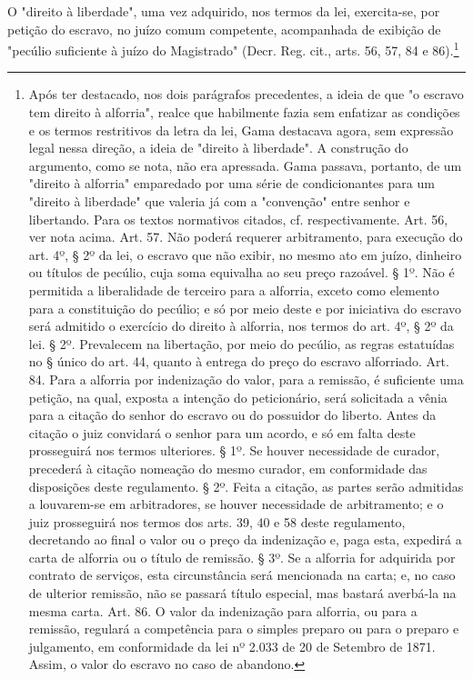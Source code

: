 O "direito à liberdade", uma vez adquirido, nos termos da lei,
exercita-se, por petição do escravo, no juízo comum competente,
acompanhada de exibição de "pecúlio suficiente à juízo do Magistrado"
(Decr. Reg. cit., arts. 56, 57, 84 e 86).\footnote{Após ter destacado,
  nos dois parágrafos precedentes, a ideia de que "o escravo tem direito
  à alforria", realce que habilmente fazia sem enfatizar as condições e
  os termos restritivos da letra da lei, Gama destacava agora, sem
  expressão legal nessa direção, a ideia de "direito à liberdade". A
  construção do argumento, como se nota, não era apressada. Gama
  passava, portanto, de um "direito à alforria" emparedado por uma série
  de condicionantes para um "direito à liberdade" que valeria já com a
  "convenção" entre senhor e libertando. Para os textos normativos
  citados, cf. respectivamente. Art. 56, ver nota acima. Art. 57. Não
  poderá requerer arbitramento, para execução do art. 4º, § 2º da lei, o
  escravo que não exibir, no mesmo ato em juízo, dinheiro ou títulos de
  pecúlio, cuja soma equivalha ao seu preço razoável. § 1º. Não é
  permitida a liberalidade de terceiro para a alforria, exceto como
  elemento para a constituição do pecúlio; e só por meio deste e por
  iniciativa do escravo será admitido o exercício do direito à alforria,
  nos termos do art. 4º, § 2º da lei. § 2º. Prevalecem na libertação,
  por meio do pecúlio, as regras estatuídas no § único do art. 44,
  quanto à entrega do preço do escravo alforriado. Art. 84. Para a
  alforria por indenização do valor, para a remissão, é suficiente uma
  petição, na qual, exposta a intenção do peticionário, será solicitada
  a vênia para a citação do senhor do escravo ou do possuidor do
  liberto. Antes da citação o juiz convidará o senhor para um acordo, e
  só em falta deste prosseguirá nos termos ulteriores. § 1º. Se houver
  necessidade de curador, precederá à citação nomeação do mesmo curador,
  em conformidade das disposições deste regulamento. § 2º. Feita a
  citação, as partes serão admitidas a louvarem-se em arbitradores, se
  houver necessidade de arbitramento; e o juiz prosseguirá nos termos
  dos arts. 39, 40 e 58 deste regulamento, decretando ao final o valor
  ou o preço da indenização e, paga esta, expedirá a carta de alforria
  ou o título de remissão. § 3º. Se a alforria for adquirida por
  contrato de serviços, esta circunstância será mencionada na carta; e,
  no caso de ulterior remissão, não se passará título especial, mas
  bastará averbá-la na mesma carta. Art. 86. O valor da indenização para
  alforria, ou para a remissão, regulará a competência para o simples
  preparo ou para o preparo e julgamento, em conformidade da lei nº
  2.033 de 20 de Setembro de 1871. Assim, o valor do escravo no caso de
  abandono.}

